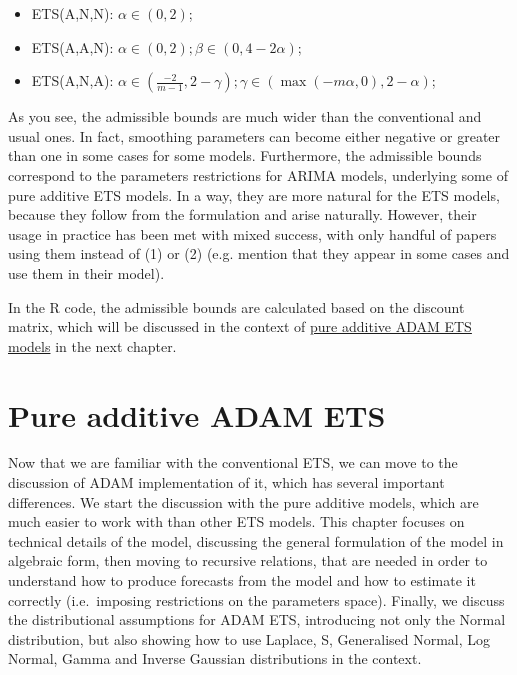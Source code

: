 \documentclass[
]{book}
\providecommand{\tightlist}{%
  \setlength{\itemsep}{0pt}\setlength{\parskip}{0pt}}
\theoremstyle{definition}
\theoremstyle{definition}
\theoremstyle{definition}
\theoremstyle{definition}
\theoremstyle{remark}
\begin{document}
\begin{itemize}
\tightlist
\item
  ETS(A,N,N): \(\alpha \in (0, 2)\);
\item
  ETS(A,A,N): \(\alpha \in (0, 2); \beta \in (0, 4-2\alpha)\);
\item
  ETS(A,N,A): \(\alpha \in \left(\frac{-2}{m-1}, 2-\gamma\right); \gamma \in (\max(-m\alpha, 0), 2-\alpha)\);
\end{itemize}

As you see, the admissible bounds are much wider than the conventional and usual ones. In fact, smoothing parameters can become either negative or greater than one in some cases for some models. Furthermore, the admissible bounds correspond to the parameters restrictions for ARIMA models, underlying some of pure additive ETS models. In a way, they are more natural for the ETS models, because they follow from the formulation and arise naturally. However, their usage in practice has been met with mixed success, with only handful of papers using them instead of (1) or (2) (e.g. \citet{Gardner2008} mention that they appear in some cases and \citet{Snyder2017} use them in their model).

In the R code, the admissible bounds are calculated based on the discount matrix, which will be discussed in the context of \protect\hyperlink{ADAMETSPureAdditive}{pure additive ADAM ETS models} in the next chapter.

\hypertarget{ADAMETSIntroduction}{%
\chapter{Pure additive ADAM ETS}\label{ADAMETSIntroduction}}

Now that we are familiar with the conventional ETS, we can move to the discussion of ADAM implementation of it, which has several important differences. We start the discussion with the pure additive models, which are much easier to work with than other ETS models. This chapter focuses on technical details of the model, discussing the general formulation of the model in algebraic form, then moving to recursive relations, that are needed in order to understand how to produce forecasts from the model and how to estimate it correctly (i.e.~imposing restrictions on the parameters space). Finally, we discuss the distributional assumptions for ADAM ETS, introducing not only the Normal distribution, but also showing how to use Laplace, S, Generalised Normal, Log Normal, Gamma and Inverse Gaussian distributions in the context.
\end{document}

